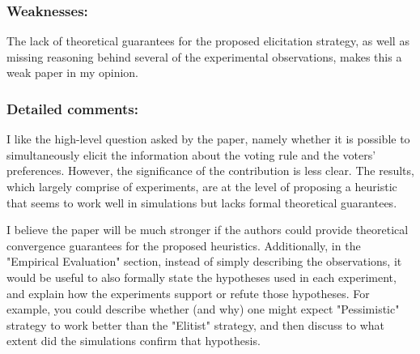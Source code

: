 \documentclass[version=3.21, pagesize, twoside=off, bibliography=totoc, DIV=calc, fontsize=12pt, a4paper]{scrartcl}
\begin{document}
\subsubsection*{Weaknesses:}	The lack of theoretical guarantees for the proposed elicitation strategy, as well as missing reasoning behind several of the experimental observations, makes this a weak paper in my opinion.

\subsubsection*{Detailed comments:}
I like the high-level question asked by the paper, namely whether it is possible to simultaneously elicit the information about the voting rule and the voters' preferences. However, the significance of the contribution is less clear. The results, which largely comprise of experiments, are at the level of proposing a heuristic that seems to work well in simulations but lacks formal theoretical guarantees.

I believe the paper will be much stronger if the authors could provide theoretical convergence guarantees for the proposed heuristics. Additionally, in the "Empirical Evaluation" section, instead of simply describing the observations, it would be useful to also formally state the hypotheses used in each experiment, and explain how the experiments support or refute those hypotheses. For example, you could describe whether (and why) one might expect "Pessimistic" strategy to work better than the "Elitist" strategy, and then discuss to what extent did the simulations confirm that hypothesis.
\end{document}
